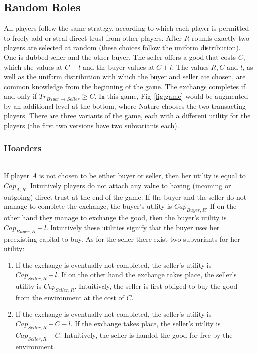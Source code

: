 \subsection{Random Roles}
  All players follow the same strategy, according to which each player is permitted to freely add or steal direct trust from
  other players. After $R$ rounds exactly two players are selected at random (these choices follow the uniform distribution).
  One is dubbed seller and the other buyer. The seller offers a good that costs $C$, which she values at $C - l$ and the buyer
  values at $C + l$. The values $R, C$ and $l$, as well as the uniform distribution with which the buyer and seller are
  chosen, are common knowledge from the beginning of the game. The exchange completes if and only if $Tr_{Buyer \rightarrow
  Seller} \geq C$. In this game, Fig~\ref{fig:game} would be augmented by an additional level at the bottom, where Nature
  chooses the two transacting players. There are three variants of the game, each with a different utility for the players
  (the first two versions have two subvariants each).

  \subsubsection{Hoarders} \ \\

    If player $A$ is not chosen to be either buyer or seller, then her utility is equal to $Cap_{A, R}$. Intuitively players
    do not attach any value to having (incoming or outgoing) direct trust at the end of the game. If the buyer and the seller
    do not manage to complete the exchange, the buyer's utility is $Cap_{Buyer, R}$. If on the other hand they manage to
    exchange the good, then the buyer's utility is $Cap_{Buyer, R} + l$. Intuitively these utilities signify that the buyer
    uses her preexisting capital to buy. As for the seller there exist two subvariants for her utility:
    \begin{enumerate}
      \item If the exchange is eventually not completed, the seller's utility is $Cap_{Seller, R} - l$. If on the other hand
      the exchange takes place, the seller's utility is $Cap_{Seller, R}$. Intuitively, the seller is first obliged to buy the
      good from the environment at the cost of $C$.

      \item If the exchange is eventually not completed, the seller's utility is $Cap_{Seller, R} + C - l$. If the exchange
      takes place, the seller's utility is $Cap_{Seller, R} + C$. Intuitively, the seller is handed the good for free by the
      environment.
    \end{enumerate}
    
